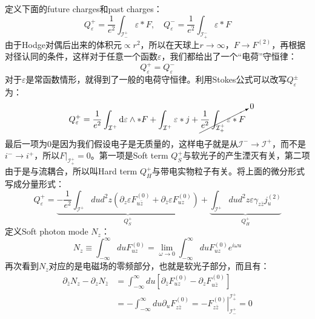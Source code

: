 定义下面的future charges和past charges：
\begin{equation}
	\boxed{
		Q_{\varepsilon}^{+}=\frac{1}{e^{2}}\int_{\mathcal I_{-}^{+}}\varepsilon*F,\quad Q_{\varepsilon}^{-}=\frac{1}{e^{2}}\int_{\mathcal I_{+}^{-}}\varepsilon*F
	}
\end{equation}
由于Hodge对偶后出来的体积元$\propto r^2$，所以在天球上$r\to\infty$，$F\to F^{(2)}$，再根据对径认同的条件，这样对于任意一个函数$\varepsilon$，我们都给出了一个“电荷”守恒律：
\begin{equation}
	\boxed{
	Q_\varepsilon^+=Q_\varepsilon^-
	}
\end{equation}
对于$\varepsilon$是常函数情形，就得到了一般的电荷守恒律。利用Stokes公式可以改写$Q_\varepsilon^{\pm}$为：
\begin{equation}
	Q_\varepsilon^+=\frac{1}{e^2}\int_{\mathcal{I}^+}\mathrm{d}\varepsilon\wedge*F+\int_{\mathcal{I}^+}\varepsilon*j+\cancelto{0}{\frac{1}{e^2}\int_{\mathcal{I}_+^+}\varepsilon*F}
\end{equation}
最后一项为0是因为我们假设电子是无质量的，这样电子就是从$\mathcal{I}^-\to\mathcal{I}^+$，而不是$i^{-}\to i^+$，所以$F|_{\mathcal{I}_+^{+}}=0$。第一项是Soft term $Q_S^+$与软光子的产生湮灭有关，第二项由于是与流耦合，所以叫Hard term $Q_H^+$与带电实物粒子有关。将上面的微分形式写成分量形式：
\begin{equation}
	Q_{\varepsilon}^{+}=\underbrace{-\frac{1}{e^{2}}\int_{\mathcal{I}^{+}}dud^{2}z\left(\partial_{z}\varepsilon F_{u\bar{z}}^{(0)}+\partial_{\bar{z}}\varepsilon F_{uz}^{(0)}\right)}_{Q_{S}^{+}}+\underbrace{\int_{\mathcal{I}^{+}}dud^{2}z\varepsilon\gamma_{z\bar{z}}j_{u}^{(2)}}_{Q_{H}^{+}}
\end{equation}
定义Soft photon mode $N_z$：
\begin{equation}\label{eq:23.18}
	N_{z}\equiv \int_{-\infty}^{\infty}duF_{uz}^{(0)}=\lim_{\omega\to0}\int_{-\infty}^{\infty}duF_{uz}^{(0)}e^{i\omega u}
\end{equation}
再次看到$N_z$对应的是电磁场的零频部分，也就是软光子部分，而且有：
\begin{equation}
	\begin{aligned}
		\partial_{\bar{z}}N_{z}-\partial_{z}N_{\bar{z}}& =\int_{-\infty}^{\infty}du\left[\partial_{\bar{z}}F_{uz}^{(0)}-\partial_{z}F_{u\bar{z}}^{(0)}\right]  \\
		&=-\int_{-\infty}^{\infty}du\left.\partial_{u}F_{z\bar{z}}^{(0)}=-F_{z\bar{z}}^{(0)}\right|_{\mathcal{I}_{-}^{+}}^{\mathcal{I}_{+}^{+}}=0
	\end{aligned}
\end{equation}
